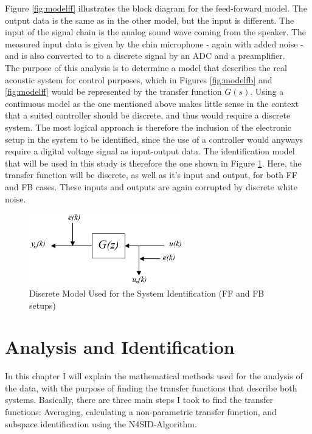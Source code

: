 Figure \ref{fig:modelff} illustrates the block diagram for the feed-forward model. The output data is the same as in the other model, but the input is different. The input of the signal chain is the analog sound wave coming from the speaker. The measured input data is given by the chin microphone - again with added noise - and is also converted to to a discrete signal by an ADC and a preamplifier.\\

The purpose of this analysis is to determine a model that describes the real acoustic system for control purposes, which in Figures \ref{fig:modelfb} and \ref{fig:modelff} would be represented by the transfer function $G(s)$. Using a continuous model as the one mentioned above makes little sense in the context that a suited controller should be discrete, and thus would require a discrete system. The most logical approach is therefore the inclusion of the electronic setup in the system to be identified, since the use of a controller would anyways require a digital voltage signal as input-output data. The identification model that will be used in this study is therefore the one shown in Figure \ref{fig:modeldiscrete}. Here, the transfer function will be discrete, as well as it's input and output, for both FF and FB cases. These inputs and outputs are again corrupted by discrete white noise.

\begin{figure}[h]
\centering
\includegraphics[width=0.6\textwidth]{pics/discrete_model}
\caption{Discrete Model Used for the System Identification (FF and FB setups)}
\label{fig:modeldiscrete}
\end{figure}



\chapter{Analysis and Identification}\label{chap: analysisandid}

In this chapter I will explain the mathematical methods used for the analysis of the data, with the purpose of finding the transfer functions that describe both systems. Basically, there are three main steps I took to find the transfer functions: Averaging, calculating a non-parametric transfer function, and subspace identification using the N4SID-Algorithm.\\


